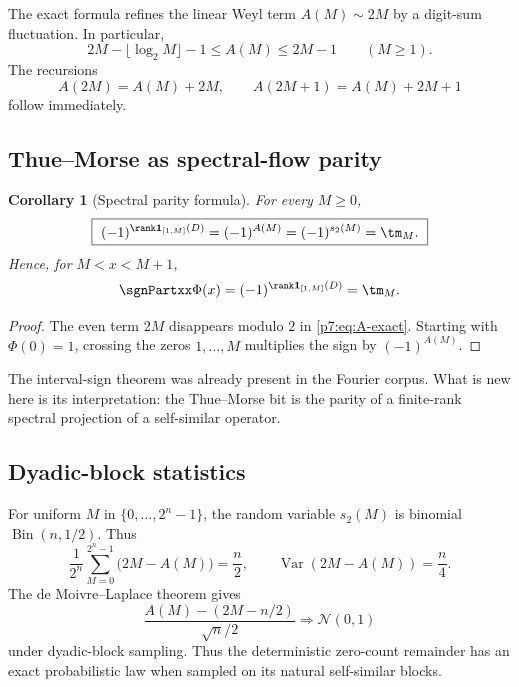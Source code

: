 \documentclass[11pt]{article}
\numberwithin{equation}{section}
\newtheorem{corollary}[theorem]{Corollary}
\theoremstyle{definition}
\theoremstyle{remark}
\begin{document}
The exact formula refines the linear Weyl term $A(M)\sim2M$ by a digit-sum fluctuation.  In particular,
\begin{equation}\label{p7:eq:A-bounds}
 2M-\lfloor\log_2M\rfloor-1\le A(M)\le2M-1
 \qquad(M\ge1).
\end{equation}
The recursions
\begin{equation}\label{p7:eq:A-rec}
 A(2M)=A(M)+2M,
 \qquad
 A(2M+1)=A(M)+2M+1
\end{equation}
follow immediately.

\subsection{Thue--Morse as spectral-flow parity}

\begin{corollary}[Spectral parity formula]\label{p7:cor:spectral-parity}
For every $M\ge0$,
\begin{equation}\label{p7:eq:spectral-parity}
 \boxed{\ (-1)^{\rank\mathbf 1_{[1,M]}(D)}=(-1)^{A(M)}
 =(-1)^{s_2(M)}=\tm_M.\ }
\end{equation}
Hence, for $M<x<M+1$,
\[
 \sgnPartxx\Phi(x)=(-1)^{\rank\mathbf 1_{[1,M]}(D)}=\tm_M.
\]
\end{corollary}

\begin{proof}
The even term $2M$ disappears modulo $2$ in \cref{p7:eq:A-exact}.  Starting with $\Phi(0)=1$, crossing the zeros $1,\ldots,M$ multiplies the sign by $(-1)^{A(M)}$.
\end{proof}

The interval-sign theorem was already present in the Fourier corpus.  What is new here is its interpretation: the Thue--Morse bit is the parity of a finite-rank spectral projection of a self-similar operator.

\subsection{Dyadic-block statistics}

For uniform $M$ in $\{0,\ldots,2^n-1\}$, the random variable $s_2(M)$ is binomial $\operatorname{Bin}(n,1/2)$.  Thus
\begin{equation}\label{p7:eq:block-mean}
 \frac1{2^n}\sum_{M=0}^{2^n-1}\bigl(2M-A(M)\bigr)=\frac n2,
 \qquad
 \operatorname{Var}(2M-A(M))=\frac n4.
\end{equation}
The de Moivre--Laplace theorem gives
\begin{equation}\label{p7:eq:count-clt}
 \frac{A(M)-(2M-n/2)}{\sqrt n/2}
 \Longrightarrow \mathcal N(0,1)
\end{equation}
under dyadic-block sampling.  Thus the deterministic zero-count remainder has an exact probabilistic law when sampled on its natural self-similar blocks.
\end{document}
